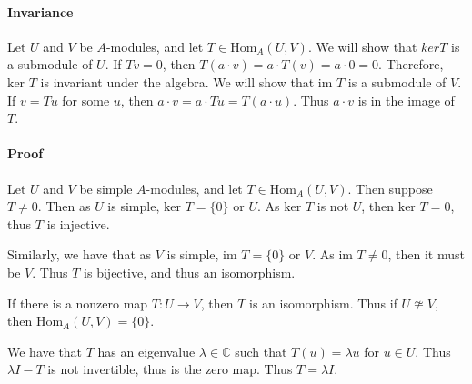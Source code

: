 \documentclass[]{article}
\begin{document}
\paragraph{Invariance}
Let $U$ and $V$ be $A$-modules, and let $T \in \text{Hom}_A(U, V)$. 
We will show that $ker T$ is a submodule of $U$.
If $Tv = 0$, then $T (a \cdot v) = a \cdot T(v) = a \cdot 0 = 0$. Therefore, $\text{ker } T$ is invariant under the algebra.
We will show that $\text{im } T$ is a submodule of $V$.
If $v = T u$ for some $u$, then $a \cdot v = a \cdot Tu = T (a \cdot u)$. Thus $a \cdot v$ is in the image of $T$.
\paragraph{Proof} 
Let $U$ and $V$ be simple $A$-modules, and let $T \in \text{Hom}_A(U, V)$. 
Then suppose $T \neq 0$. Then as $U$ is simple, $\text{ker } T = \lbrace 0 \rbrace$ or $U$. As $\text{ker } T$ is not $U$, then $\text{ker } T = 0$, thus $T$ is injective.

Similarly, we have that as $V$ is simple, $\text{im } T = \lbrace 0 \rbrace$ or $V$. As $\text{im } T \neq 0$, then it must be $V$. Thus $T$ is bijective, and thus an isomorphism.
\par
If there is a nonzero map $T : U \rightarrow V$, then $T$ is an isomorphism. Thus if $U \ncong V$, then $\text{Hom}_A(U, V) = \lbrace 0 \rbrace$.

\par
We have that $T$ has an eigenvalue $\lambda \in \mathbb{C}$ such that $T(u) = \lambda u$ for $u \in U$. Thus $\lambda I - T$ is not invertible, thus is the zero map. Thus $T = \lambda I$. 
\end{document}
